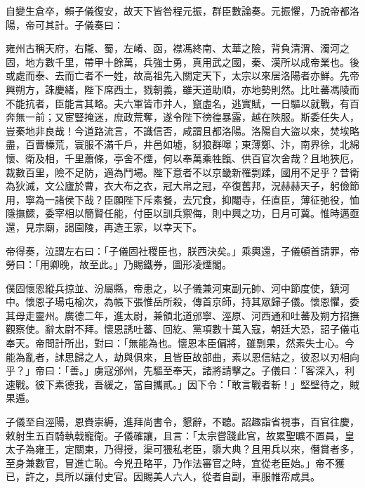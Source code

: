 \begin{pinyinscope}
 自變生倉卒，賴子儀復安，故天下皆咎程元振，群臣數論奏。元振懼，乃說帝都洛陽，帝可其計。子儀奏曰：



 雍州古稱天府，右隴、蜀，左崤、函，襟馮終南、太華之險，背負清渭、濁河之固，地方數千里，帶甲十餘萬，兵強士勇，真用武之國，秦、漢所以成帝業也。後或處而泰、去而亡者不一姓，故高祖先入關定天下，太宗以來居洛陽者亦鮮。先帝興朔方，誅慶緒，陛下席西土，戮朝義，雖天道助順，亦地勢則然。比吐蕃馮陵而不能抗者，臣能言其略。夫六軍皆市井人，竄虛名，逃實賦，一日驅以就戰，有百奔無一前；又宦豎掩迷，庶政荒奪，遂令陛下徬徨暴露，越在陜服。斯委任失人，豈秦地非良哉！今道路流言，不識信否，咸謂且都洛陽。洛陽自大盜以來，焚埃略盡，百曹榛荒，寰服不滿千戶，井邑如墟，豺狼群嗥；東薄鄭、汴，南界徐，北綿懷、衛及相，千里蕭條，亭舍不煙，何以奉萬乘牲餼、供百官次舍哉？且地狹厄，裁數百里，險不足防，適為鬥場。陛下意者不以京畿新罹剽蹂，國用不足乎？昔衛為狄滅，文公廬於曹，衣大布之衣，冠大帛之冠，卒復舊邦，況赫赫天子，躬儉節用，寧為一諸侯下哉？臣願陛下斥素餐，去冗食，抑閹寺，任直臣，薄征弛役，恤隱撫鰥，委宰相以簡賢任能，付臣以訓兵禦侮，則中興之功，日月可冀。惟時邁亟還，見宗廟，謁園陵，再造王家，以幸天下。



 帝得奏，泣謂左右曰：「子儀固社稷臣也，朕西決矣。」乘輿還，子儀頓首請罪，帝勞曰：「用卿晚，故至此。」乃賜鐵券，圖形凌煙閣。



 僕固懷恩縱兵掠並、汾屬縣，帝患之，以子儀兼河東副元帥、河中節度使，鎮河中。懷恩子瑒屯榆次，為帳下張惟岳所殺，傳首京師，持其眾歸子儀。懷恩懼，委其母走靈州。廣德二年，進太尉，兼領北道邠寧、涇原、河西通和吐蕃及朔方招撫觀察使。辭太尉不拜。懷恩誘吐蕃、回紇、黨項數十萬入寇，朝廷大恐，詔子儀屯奉天。帝問計所出，對曰：「無能為也。懷恩本臣偏將，雖剽果，然素失士心。今能為亂者，訹思歸之人，劫與俱來，且皆臣故部曲，素以恩信結之，彼忍以刃相向乎？」帝曰：「善。」虜寇邠州，先驅至奉天，諸將請擊之。子儀曰：「客深入，利速戰。彼下素德我，吾緩之，當自攜貳。」因下令：「敢言戰者斬！」堅壁待之，賊果遁。



 子儀至自涇陽，恩賚崇縟，進拜尚書令，懇辭，不聽。詔趣詣省視事，百官往慶，敕射生五百騎執戟寵衛。子儀確讓，且言：「太宗嘗踐此官，故累聖曠不置員，皇太子為雍王，定關東，乃得授，渠可猥私老臣，隳大典？且用兵以來，僭賞者多，至身兼數官，冒進亡恥。今兇丑略平，乃作法審官之時，宜從老臣始。」帝不獲已，許之，具所以讓付史官。因賜美人六人，從者自副，車服帷帟咸具。




\end{pinyinscope}
